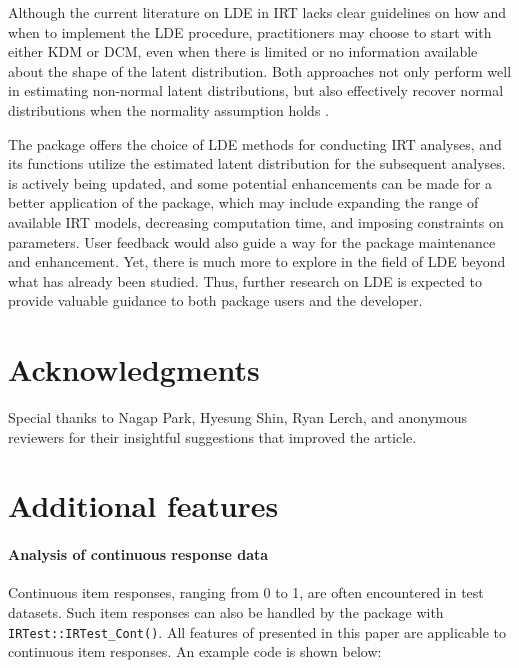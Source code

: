Although the current literature on LDE in IRT lacks
clear guidelines on how and when to implement the LDE procedure, practitioners
may choose to start with either KDM or DCM, even when there is limited
or no information available about the shape of the latent distribution.
Both approaches not only perform well in estimating non-normal latent
distributions, but also effectively recover normal distributions when the
normality assumption holds \citep{Li:2022, Woods+Lin:2009}.

The  package offers the choice of LDE methods for
conducting IRT analyses, and its functions utilize the estimated latent
distribution for the subsequent analyses.  is actively being
updated, and some potential enhancements can be made for a better
application of the package, which may include expanding the range of
available IRT models, decreasing computation time, and imposing
constraints on parameters. User feedback would also guide a way for the
package maintenance and enhancement. Yet, there is much more to explore
in the field of LDE beyond what has already been studied.
Thus, further research on LDE is expected to provide valuable guidance to
both package users and the developer.

\hypertarget{acknowledgments}{%
\section*{Acknowledgments}\label{acknowledgments}}

Special thanks to Nagap Park, Hyesung Shin, Ryan Lerch, and anonymous reviewers for
their insightful suggestions that improved the article.

\hypertarget{additional-features}{%
\section*{Additional features}\label{additional-features}}

\hypertarget{analysis-of-continuous-response-data}{%
\paragraph*{Analysis of continuous response data}\label{analysis-of-continuous-response-data}}

Continuous item responses, ranging from 0 to 1, are often encountered
in test datasets. Such item responses can also be handled by the
 package with \texttt{IRTest::IRTest\_Cont()}.
All features of  presented in this paper are
applicable to continuous item responses. An example code is shown below:

